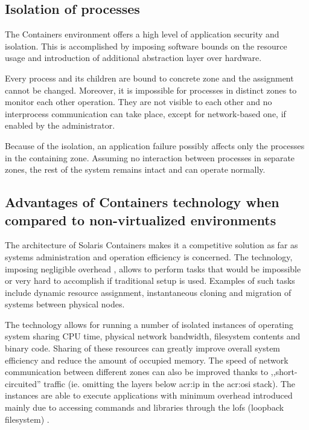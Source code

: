 \documentclass[11pt,openany]{book}
\begin{document}
      \subsection{Isolation of processes}
      \label{sub:}

        The Containers environment offers a high level of application security and isolation. This is accomplished by
        imposing software bounds on the resource usage and introduction of additional abstraction layer over hardware.

        Every process and its children are bound to concrete zone and the assignment cannot be changed. Moreover, it is
        impossible for processes in distinct zones to monitor each other operation. They are not visible to each other
        and no interprocess communication can take place, except for network-based one, if enabled by the administrator.

        Because of the isolation, an application failure possibly affects only the processes in the containing zone.
        Assuming no interaction between processes in separate zones, the rest of the system remains intact and can
        operate normally.
        
      

      \subsection{Advantages of Containers technology when compared to non-virtualized environments}
      \label{sub:}

        The architecture of Solaris Containers makes it a competitive solution as far as systems administration and
        operation efficiency is concerned. The technology, imposing negligible overhead \cite{price}, allows to perform
        tasks that would be impossible or very hard to accomplish if traditional setup is used. Examples of such tasks
        include dynamic resource assignment, instantaneous cloning and migration of systems between physical nodes.

        The technology allows for running a number of isolated instances of operating system sharing CPU time, physical
        network bandwidth, filesystem contents and binary code. Sharing of these resources can greatly improve overall
        system efficiency and reduce the amount of occupied memory. The speed of network communication between different
        zones can also be improved thanks to ,,short-circuited'' traffic (ie. omitting the layers below \gls{acr:ip} in
        the \gls{acr:osi} stack). The instances are able to execute applications with minimum overhead introduced mainly
        due to accessing commands and libraries through the lofs (loopback filesystem) \cite{price,fsag}.
\end{document}
